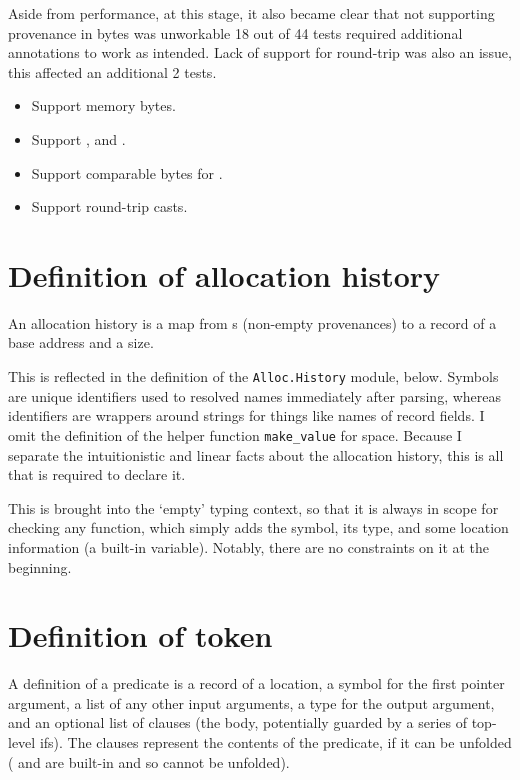 Aside from performance, at this stage, it also became clear that not supporting
provenance in bytes was unworkable \textemdash{} 18 out of 44 tests required
additional  annotations to work as intended. Lack of
support for round-trip was also an issue, this affected an additional 2 tests.

\begin{itemize}
    \item Support memory bytes.
    \item Support ,  and .
    \item Support comparable bytes for .
    \item Support round-trip casts.
\end{itemize}

\section{Definition of allocation history}

An allocation history is a map from s (non-empty provenances) to a
record of a base address and a size.

This is reflected in the definition of the \texttt{Alloc.History}
module, below. Symbols are unique identifiers used to resolved names
immediately after parsing, whereas identifiers are wrappers around strings for
things like names of record fields. I omit the definition of the helper function
\texttt{make_value} for space. Because I separate the intuitionistic
and linear facts about the allocation history, this is all that is required to
declare it.


This is brought into the `empty' typing context, so that it is always in scope
for checking any function, which simply adds the symbol, its type, and some
location information (a built-in variable). Notably, there are no constraints
on it at the beginning.


\section{Definition of  token}

A definition of a predicate is a record of a location, a symbol for the first
pointer argument, a list of any other input arguments, a type for the output
argument, and an optional list of clauses (the body, potentially guarded by a
series of top-level ifs). The clauses represent the contents of the predicate,
if it can be unfolded ( and  are built-in and
so cannot be unfolded).

